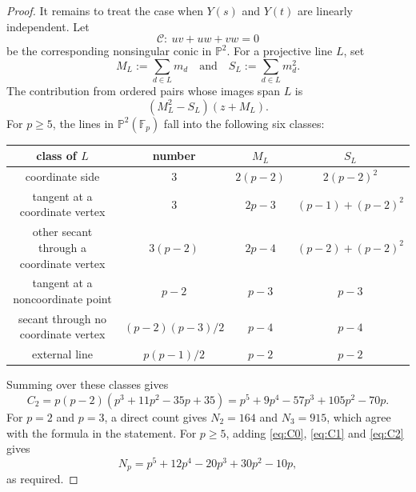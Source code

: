 \documentclass[a4paper]{amsart}
\numberwithin{equation}{section}
\theoremstyle{remark}
\newcommand{\F}{\mathbb{F}}
\begin{document}
\begin{proof}
It remains to treat the case when $Y(s)$ and $Y(t)$ are linearly independent. Let
\[\mathcal C:\ uv+uw+vw=0\]
be the corresponding nonsingular conic in $\mathbb P^2$. For a projective line $L$, set
\[M_L:=\sum_{d\in L}m_d\quad\text{and}\quad S_L:=\sum_{d\in L}m_d^2.\]
The contribution from ordered pairs whose images span $L$ is
\[(M_L^2-S_L)(z+M_L).\]
For $p\geq5$, the lines in $\mathbb P^2(\F_p)$ fall into the following six classes:
\begin{center}
\begin{tabular}{c|c|c|c}
class of $L$ & number & $M_L$ & $S_L$\\ \hline
coordinate side & $3$ & $2(p-2)$ & $2(p-2)^2$\\
tangent at a coordinate vertex & $3$ & $2p-3$ & $(p-1)+(p-2)^2$\\
other secant through a coordinate vertex & $3(p-2)$ & $2p-4$ & $(p-2)+(p-2)^2$\\
tangent at a noncoordinate point & $p-2$ & $p-3$ & $p-3$\\
secant through no coordinate vertex & $(p-2)(p-3)/2$ & $p-4$ & $p-4$\\
external line & $p(p-1)/2$ & $p-2$ & $p-2$
\end{tabular}
\end{center}
Summing over these classes gives
\begin{equation}\label{eq:C2}
C_2=p(p-2)(p^3+11p^2-35p+35)=p^5+9p^4-57p^3+105p^2-70p.
\end{equation}
For $p=2$ and $p=3$, a direct count gives $N_2=164$ and $N_3=915$, which agree with the formula in the statement. For $p\geq5$, adding \eqref{eq:C0}, \eqref{eq:C1} and \eqref{eq:C2} gives
\[N_p=p^5+12p^4-20p^3+30p^2-10p,\]
as required.
\end{proof}
\end{document}
